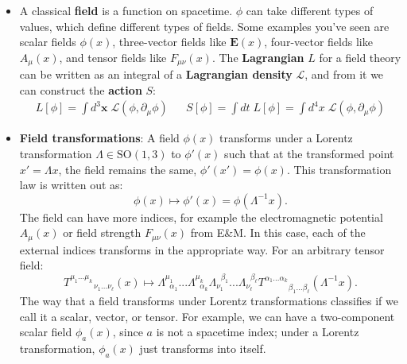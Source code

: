 \documentclass[12pt, oneside]{article}   	%
\theoremstyle{definition}
\begin{document}
\begin{itemize}

	\item A classical \textbf{field} is a function on spacetime. $\phi$ can take different types of values, which define different types of fields. Some examples you've seen are scalar fields $\phi(x)$, three-vector fields like $\bm E(x)$, four-vector fields like $A_\mu(x)$, and tensor fields like $F_{\mu\nu}(x)$. The \textbf{Lagrangian} $L$ for a field theory can be written as an integral of a \textbf{Lagrangian density} $\mathcal L$, and from it we can construct the \textbf{action} $S$:
	\begin{align}
		L[\phi] = \int d^3\bm x\; \mathcal{L}(\phi, \partial_\mu\phi) && S[\phi] = \int dt \; L[\phi] = \int d^4x\; \mathcal L(\phi, \partial_\mu\phi)
	\end{align}
	
	\item \textbf{Field transformations}: A field $\phi(x)$ transforms under a Lorentz transformation $\Lambda\in\mathrm{SO}(1, 3)$ to $\phi'(x)$ such that at the transformed point $x' = \Lambda x$, the field remains the same, $\phi'(x') = \phi(x)$. This transformation law is written out as:
	\begin{equation}
		\phi(x)\mapsto \phi'(x) = \phi(\Lambda^{-1}x).
	\end{equation}
	The field can have more indices, for example the electromagnetic potential $A_\mu(x)$ or field strength $F_{\mu\nu}(x)$ from E\&M. In this case, each of the external indices transforms in the appropriate way. For an arbitrary tensor field:
	\begin{equation}
		T^{\mu_1 ... \mu_k}_{\;\;\;\;\;\;\;\;\;\;\;\nu_1 ... \nu_\ell}(x)\mapsto \Lambda^{\mu_1}_{\;\;\alpha_1} ... \Lambda^{\mu_k}_{\;\;\alpha_k} 
		\Lambda_{\nu_1}^{\;\;\beta_1} ... \Lambda_{\nu_\ell}^{\;\;\beta_\ell} T^{\alpha_1 ... \alpha_k}_{\;\;\;\;\;\;\;\;\;\;\;\beta_1 ... \beta_\ell}(\Lambda^{-1}x).
	\end{equation}
	The way that a field transforms under Lorentz transformations classifies if we call it a scalar, vector, or tensor. For example, we can have a two-component scalar field $\phi_a(x)$, since $a$ is not a spacetime index; under a Lorentz transformation, $\phi_a(x)$ just transforms into itself. 
	
	

\end{itemize}
\end{document}
